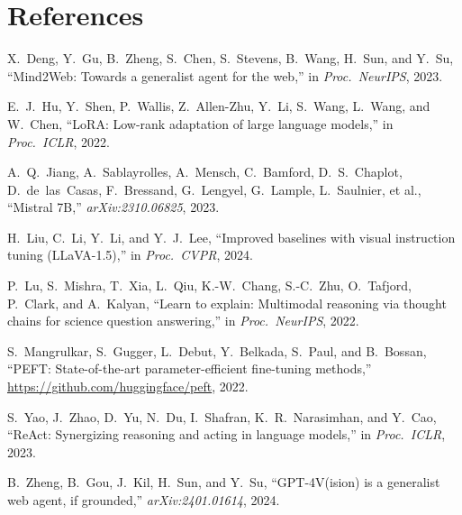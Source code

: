 \documentclass[10pt,twocolumn]{article}
\begin{document}
\section*{References}
{\small
\begin{enumerate}[label={[\arabic*]},leftmargin=*,topsep=4pt,itemsep=2pt]

  \item\label{ref:deng2023} X.~Deng, Y.~Gu, B.~Zheng, S.~Chen, S.~Stevens, B.~Wang,
    H.~Sun, and Y.~Su,
    ``Mind2Web: Towards a generalist agent for the web,''
    in \emph{Proc.\ NeurIPS}, 2023.

  \item\label{ref:hu2022} E.~J.~Hu, Y.~Shen, P.~Wallis, Z.~Allen-Zhu, Y.~Li, S.~Wang,
    L.~Wang, and W.~Chen,
    ``LoRA: Low-rank adaptation of large language models,''
    in \emph{Proc.\ ICLR}, 2022.

  \item\label{ref:jiang2023} A.~Q.~Jiang, A.~Sablayrolles, A.~Mensch, C.~Bamford,
    D.~S.~Chaplot, D.~de~las~Casas, F.~Bressand, G.~Lengyel, G.~Lample,
    L.~Saulnier, et al.,
    ``Mistral 7B,''
    \emph{arXiv:2310.06825}, 2023.

  \item\label{ref:liu2024} H.~Liu, C.~Li, Y.~Li, and Y.~J.~Lee,
    ``Improved baselines with visual instruction tuning (LLaVA-1.5),''
    in \emph{Proc.\ CVPR}, 2024.

  \item\label{ref:lu2022} P.~Lu, S.~Mishra, T.~Xia, L.~Qiu, K.-W.~Chang, S.-C.~Zhu,
    O.~Tafjord, P.~Clark, and A.~Kalyan,
    ``Learn to explain: Multimodal reasoning via thought chains for science question answering,''
    in \emph{Proc.\ NeurIPS}, 2022.

  \item\label{ref:mangrulkar2022} S.~Mangrulkar, S.~Gugger, L.~Debut, Y.~Belkada,
    S.~Paul, and B.~Bossan,
    ``PEFT: State-of-the-art parameter-efficient fine-tuning methods,''
    \url{https://github.com/huggingface/peft}, 2022.

  \item\label{ref:yao2023} S.~Yao, J.~Zhao, D.~Yu, N.~Du, I.~Shafran,
    K.~R.~Narasimhan, and Y.~Cao,
    ``ReAct: Synergizing reasoning and acting in language models,''
    in \emph{Proc.\ ICLR}, 2023.

  \item\label{ref:zheng2024} B.~Zheng, B.~Gou, J.~Kil, H.~Sun, and Y.~Su,
    ``GPT-4V(ision) is a generalist web agent, if grounded,''
    \emph{arXiv:2401.01614}, 2024.

\end{enumerate}
}

\end{document}
